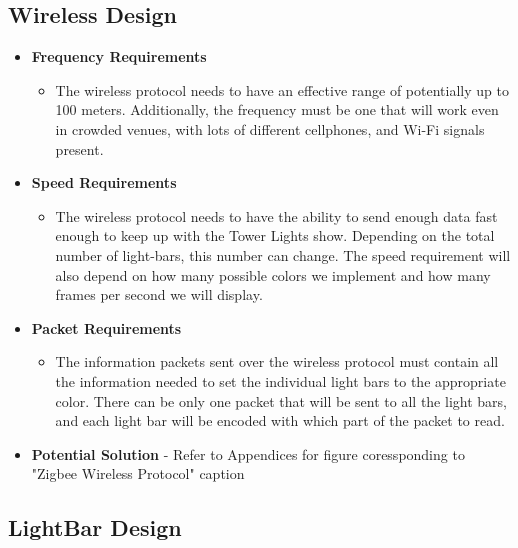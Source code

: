 \documentclass[12pt]{article}
\begin{document}
{{			%
			\subsection{Wireless Design}
				
					{\renewcommand\labelitemi{}
						\begin{itemize}
							\item \textbf{Frequency Requirements}
							\begin{itemize}
								\item The wireless protocol needs to have an effective range of potentially up to 100 meters. Additionally, the
								frequency must be one that will work even in crowded venues, with lots of different cellphones, and
								Wi-Fi signals present.
							\end{itemize}
							\item \textbf{Speed Requirements}
							\begin{itemize}
								\item The wireless protocol needs to have the ability to send enough data fast enough to keep up with the
								Tower Lights show. Depending on the total number of light-bars, this number can change. The speed
								requirement will also depend on how many possible colors we implement and how many frames per
								second we will display.
							\end{itemize}
							\item \textbf{Packet Requirements}
							\begin{itemize}
								\item The information packets sent over the wireless protocol must contain all the information needed to set
								the individual light bars to the appropriate color. There can be only one packet that will be sent to all
								the light bars, and each light bar will be encoded with which part of the packet to read.
							\end{itemize}
							\item \textbf{Potential Solution} - Refer to Appendices for figure coressponding to "Zigbee Wireless Protocol" caption
						\end{itemize}
		
			\subsection{LightBar Design}
			
}}}
\end{document}
